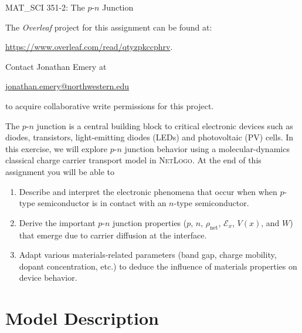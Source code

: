\documentclass[12pt]{exam}
\begin{document}
			
{\Large \textcolor{NUpurp120}{MAT\_SCI 351-2: The $p$-$n$ Junction}}

\begin{LabGuide}

The \textit{Overleaf} project for this assignment can be found  at:

\begin{center}
\href{https://www.overleaf.com/project/https://www.overleaf.com/read/qtyzpkccphrv}{https://www.overleaf.com/read/qtyzpkccphrv}.
\end{center}

Contact Jonathan Emery at

\begin{center}
\href{mailto:jonathan.emery@northwestern.edu}{jonathan.emery@northwestern.edu}
\end{center}

to acquire collaborative write permissions for this project.

\end{LabGuide}

The $p$-$n$ junction is a central building block to critical electronic devices such as diodes, transistors, light-emitting diodes (LEDs) and photovoltaic (PV) cells. In this exercise, we will explore $p$-$n$ junction behavior using a molecular-dynamics classical charge carrier transport model in \textsc{NetLogo}. At the end of this assignment you will be able to 

\begin{enumerate}
    \item Describe and interpret the electronic phenomena that occur when when $p$-type semiconductor is in contact with an $n$-type semiconductor.
    \item Derive the important $p$-$n$ junction properties ($p$, $n$, $\rho_{\mathrm{net}}$, $\mathcal{E}_x$, $V(x)$, and $W$) that emerge due to carrier diffusion at the interface.
    \item Adapt various materials-related parameters (band gap, charge mobility, dopant concentration, etc.) to deduce the influence of materials properties on device behavior.
\end{enumerate}

\section*{Model Description} %
\end{document}
